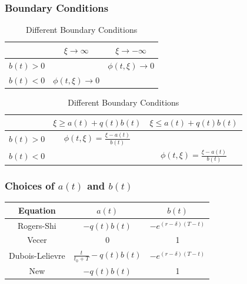 \documentclass{beamer}
\begin{document}
  \begin{frame}
    \frametitle{Boundary Conditions}
    \begin{table}[h]
      \begin{tabular}{|c|c|c|}
        \hline
        & \(\xi \rightarrow \infty\) & \(\xi \rightarrow -\infty\) \\
        \hline
        \(b(t) > 0\) &  & \(\phi(t, \xi) \rightarrow 0\) \\
        \(b(t) < 0\) & \(\phi(t, \xi) \rightarrow 0\) & \\
        \hline
      \end{tabular}
      \begin{tabular}{|c|c|c|}
        \hline
        & \(\xi \ge a(t) + q(t)b(t)\) & \(\xi \le a(t) + q(t)b(t)\) \\
        \hline
        \(b(t) > 0\) & \(\phi(t, \xi) = \frac{\xi-a(t)}{b(t)} \) & \\
        \(b(t) < 0\) &  & \( \phi(t, \xi) = \frac{\xi-a(t)}{b(t)} \) \\
        \hline
      \end{tabular}
      \caption{Different Boundary Conditions}
    \end{table}
  \end{frame}

  \begin{frame}
    \frametitle{Choices of \(a(t)\) and \(b(t)\)}
    \begin{table}[h]
      \begin{tabular}{|c|c|c|}
      \hline
      Equation & \(a(t)\) & \(b(t)\) \\
      \hline
      Rogers-Shi & \(-q(t)b(t)\) & \(-e^{(r-\delta)(T-t)}\) \\
      Vecer & 0 & 1 \\
      Dubois-Lelievre & \(\frac{t}{t_0 + T} - q(t)b(t) \) & \(-e^{(r-\delta)(T-t)}\) \\
      New & \(-q(t)b(t)\) & 1 \\
      \hline
      \end{tabular}
    \end{table}
  \end{frame}
  
\end{document}
